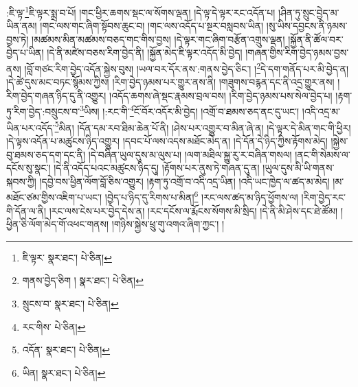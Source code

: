 :ཇི་ལྟ་\footnote{ཇི་ལྟར་  སྣར་ཐང་།  པེ་ཅིན། }ཇི་ལྟར་སྨྲ་བ་པོ། །གང་ཕྱིར་ཆགས་སྡང་ལ་སོགས་ལྡན། །དེ་ལྟ་དེ་ལྟར་རང་འདོན་པ། །ཤིན་ཏུ་སྲུང་བྱེད་མ་ཡིན་ནམ། །གང་ལས་གང་ཞིག་སྟོབས་ཆུང་བ། །གང་ལས་འདོད་པ་སྔར་བསླབས་ཡིན། །སུ་ཡིས་དབྱངས་ནི་ཉམས་བྱས་ཏེ། །མཚམས་མིན་མཚམས་བཅད་གང་གིས་བྱས། །དེ་ལྟར་གང་ཞིག་བརྩོན་འགྲུས་ལྡན། །སྐྱོན་ནི་ཚོལ་བར་བྱེད་པ་ཡིན། །དེ་ནི་མཛེས་བཅས་རིག་བྱེད་ནི། །སྐྱོན་མེད་ཇི་ལྟར་འདོད་མི་བྱེད། །གཞན་གྱིས་རིག་བྱེད་ཉམས་བྱས་ནས། །བློ་གཙང་རིག་བྱེད་འདོན་སྐྱེས་བུས། །ཡལ་བར་དོར་ནས་:གནས་བྱེད་ཅིང་། །\footnote{གནས་བྱེད་ཅིག །  སྣར་ཐང་།  པེ་ཅིན། }དེ་དག་གནོད་པར་མི་བྱེད་ན། །དེ་ཚེ་དུས་མང་བཏང་སྙོམས་ཀྱིས། །རིག་བྱེད་ཉམས་པར་གྱུར་ནས་ནི། །གཟུགས་བརྙན་དང་ནི་འདྲ་གྱུར་ནས། །རིག་བྱེད་གཞན་ཉིད་དུ་ནི་འགྱུར། །འདོད་ཆགས་ཞེ་སྡང་རྣམས་བྲལ་བས། །རིག་བྱེད་ཉམས་པས་སེལ་བྱེད་པ། །རྟག་ཏུ་རིག་བྱེད་:བསྲུངས་བ་\footnote{སྲུངས་བ་  སྣར་ཐང་།  པེ་ཅིན། }ཡིས། །:རང་གི་\footnote{རང་གིས་  པེ་ཅིན། }ངོ་བོར་འདོར་མི་བྱེད། །འགྲོ་བ་ཐམས་ཅད་ནང་དུ་ཡང་། །འདི་འདྲ་མ་ཡིན་པར་འདོད་\footnote{འདོན་  སྣར་ཐང་།  པེ་ཅིན། }མིན། །དོན་དམ་རབ་ཐིམ་ཆེན་པོ་ནི། །ཤེས་པར་འགྱུར་བ་མིན་ཞེ་ན། །དེ་ལྟར་དེ་མིན་གང་གི་ཕྱིར། །དེ་ལྟས་འདོན་པ་མཚུངས་ཉིད་འགྱུར། །དབང་པོ་ལས་འདས་མཐོང་མེད་ན། །དེ་དོན་དེ་ཉིད་ཀྱིས་རྟོགས་མེད། །སྐྱེས་བུ་ཐམས་ཅད་དག་དང་ནི། །དེ་བཞིན་ཡུལ་དུས་མ་ལུས་པ། །ལག་མཐིལ་སྐྱུ་རུ་ར་བཞིན་གསལ། །ནང་གི་སེམས་ལ་དངོས་སུ་སྣང་། །དེ་ནི་འདོད་པའང་མཚུངས་ཉིད་དུ། །རྟོགས་པར་ནུས་ཏེ་གཞན་དུ་ན། །ཡུལ་དུས་མི་ཡི་གནས་སྐབས་ཀྱི། །དབྱེ་བས་ཕྱིན་ལོག་བློ་ཅིས་འགྱུར། །རྟག་ཏུ་འགྲོ་བ་འདི་འདྲ་ཡིན། །འདི་ཡང་ཁྱེད་ལ་ཚད་མ་མེད། །མ་མཐོང་ཙམ་གྱིས་འཇིག་པ་ཡང་། །བྱེད་པ་ཉིད་དུ་རིགས་པ་མིན།\footnote{ཡིན།  སྣར་ཐང་།  པེ་ཅིན། } །རང་ལས་ཚད་མ་ཉིད་ཕྱོགས་ལ། །རིག་བྱེད་རང་གི་དོན་ལ་ནི། །རང་ལས་ངེས་པར་བྱེད་དེས་ན། །རང་དངོས་ལ་རྨོངས་སོགས་མི་སྲིད། །དེ་ནི་མི་ཤེས་དང་ཐེ་ཚོམ། །ཕྱིན་ཅི་ལོག་མེད་གོ་འཕང་གནས། །གཉིས་སྐྱེས་ཕྲུ་གུ་འགའ་ཞིག་ཀྱང་། །
